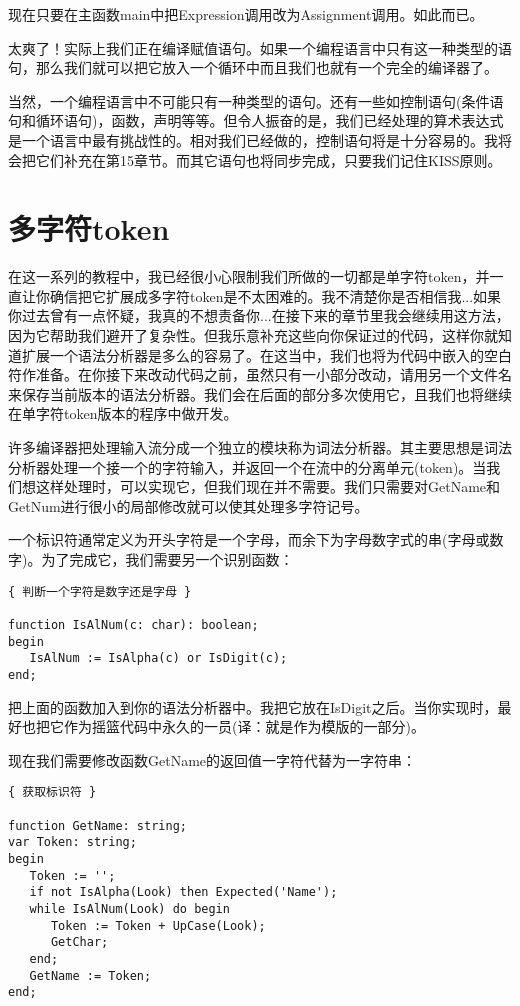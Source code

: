 现在只要在主函数main中把Expression调用改为Assignment调用。如此而已。

太爽了！实际上我们正在编译赋值语句。如果一个编程语言中只有这一种类型的语句，那么我们就可以把它放入一个循环中而且我们也就有一个完全的编译器了。

当然，一个编程语言中不可能只有一种类型的语句。还有一些如控制语句(条件语句和循环语句)，函数，声明等等。但令人振奋的是，我们已经处理的算术表达式是一个语言中最有挑战性的。相对我们已经做的，控制语句将是十分容易的。我将会把它们补充在第15章节。而其它语句也将同步完成，只要我们记住KISS原则。

\section{多字符token}

在这一系列的教程中，我已经很小心限制我们所做的一切都是单字符token，并一直让你确信把它扩展成多字符token是不太困难的。我不清楚你是否相信我...如果你过去曾有一点怀疑，我真的不想责备你...在接下来的章节里我会继续用这方法，因为它帮助我们避开了复杂性。但我乐意补充这些向你保证过的代码，这样你就知道扩展一个语法分析器是多么的容易了。在这当中，我们也将为代码中嵌入的空白符作准备。在你接下来改动代码之前，虽然只有一小部分改动，请用另一个文件名来保存当前版本的语法分析器。我们会在后面的部分多次使用它，且我们也将继续在单字符token版本的程序中做开发。

许多编译器把处理输入流分成一个独立的模块称为词法分析器。其主要思想是词法分析器处理一个接一个的字符输入，并返回一个在流中的分离单元(token)。当我们想这样处理时，可以实现它，但我们现在并不需要。我们只需要对GetName和GetNum进行很小的局部修改就可以使其处理多字符记号。

一个标识符通常定义为开头字符是一个字母，而余下为字母数字式的串(字母或数字)。为了完成它，我们需要另一个识别函数：

\begin{verbatim}
{ 判断一个字符是数字还是字母 }

function IsAlNum(c: char): boolean;
begin
   IsAlNum := IsAlpha(c) or IsDigit(c);
end;
\end{verbatim}

把上面的函数加入到你的语法分析器中。我把它放在IsDigit之后。当你实现时，最好也把它作为摇篮代码中永久的一员(译：就是作为模版的一部分)。

现在我们需要修改函数GetName的返回值一字符代替为一字符串：

\begin{verbatim}
{ 获取标识符 }

function GetName: string;
var Token: string;
begin
   Token := '';
   if not IsAlpha(Look) then Expected('Name');
   while IsAlNum(Look) do begin
      Token := Token + UpCase(Look);
      GetChar;
   end;
   GetName := Token;
end;
\end{verbatim}

